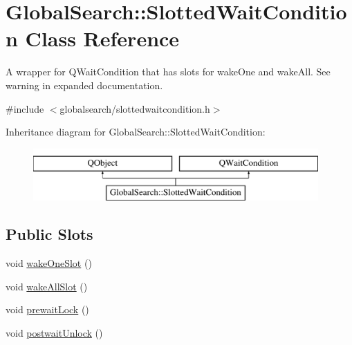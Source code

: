 \hypertarget{classGlobalSearch_1_1SlottedWaitCondition}{}\section{Global\+Search\+:\+:Slotted\+Wait\+Condition Class Reference}
\label{classGlobalSearch_1_1SlottedWaitCondition}


A wrapper for Q\+Wait\+Condition that has slots for wake\+One and wake\+All. See warning in expanded documentation.  




{\ttfamily \#include $<$globalsearch/slottedwaitcondition.\+h$>$}

Inheritance diagram for Global\+Search\+:\+:Slotted\+Wait\+Condition\+:\begin{figure}[H]
\begin{center}
\leavevmode
\includegraphics[height=2.000000cm]{classGlobalSearch_1_1SlottedWaitCondition}
\end{center}
\end{figure}
\subsection*{Public Slots}
\begin{DoxyCompactItemize}
\item 
void \hyperlink{classGlobalSearch_1_1SlottedWaitCondition_a26b060dde9c49345da5fe1c8dbd3374c}{wake\+One\+Slot} ()
\item 
void \hyperlink{classGlobalSearch_1_1SlottedWaitCondition_a4024066fe5db52f2e2c9257fcfbb5320}{wake\+All\+Slot} ()
\item 
void \hyperlink{classGlobalSearch_1_1SlottedWaitCondition_afb1ba4315ffa2de59eaf5045d2a4c09f}{prewait\+Lock} ()
\item 
void \hyperlink{classGlobalSearch_1_1SlottedWaitCondition_a3c9f9e3ba7eebdc3cc270445385e334c}{postwait\+Unlock} ()
\end{DoxyCompactItemize}
